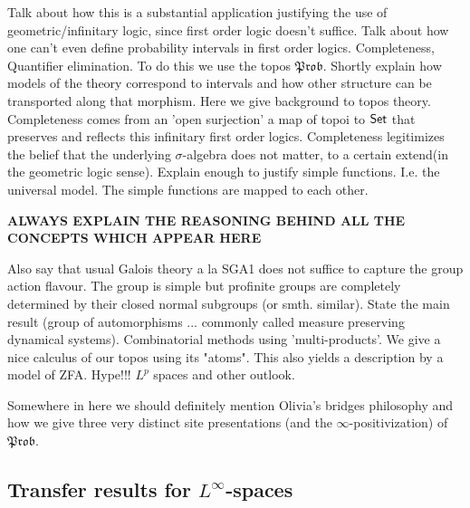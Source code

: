 \documentclass[a4paper]{amsproc}
\theoremstyle{plain}
\theoremstyle{definition}
\theoremstyle{remark}
\numberwithin{equation}{section}
\newcommand{\Set}{\textup{\textsf{Set}}}
\newcommand{\Prob}{\mathfrak{Prob}}
\begin{document}
\indent Talk about how this is a substantial application justifying the use of geometric/infinitary logic, since first order logic doesn't suffice. Talk about how one can't even define probability intervals in first order logics. Completeness, Quantifier elimination.\newline
\indent To do this we use the topos $\Prob$. Shortly explain how models of the theory correspond to intervals and how other structure can be transported along that morphism. Here we give background to topos theory. Completeness comes from an 'open surjection' a map of topoi to $\Set$ that preserves and reflects this infinitary first order logics. Completeness legitimizes the belief that the underlying $\sigma$-algebra does not matter, to a certain extend(in the geometric logic sense). Explain enough to justify simple functions. I.e. the universal model. The simple functions are mapped to each other.
\begin{center}\textbf{ALWAYS EXPLAIN THE REASONING BEHIND ALL THE CONCEPTS WHICH APPEAR HERE}\end{center}
Also say that usual Galois theory a la SGA1 does not suffice to capture the group action flavour. The group is simple but profinite groups are completely determined by their closed normal subgroups (or smth. similar). State the main result (group of automorphisms ... commonly called measure preserving dynamical systems).\newline
\indent Combinatorial methods using 'multi-products'. We give a nice calculus of our topos using its "atoms". This also yields a description by a model of ZFA. \newline
\indent Hype!!! $L^p$ spaces and other outlook.

Somewhere in here we should definitely mention Olivia's bridges philosophy and how we give three very distinct site presentations (and the $\infty$-positivization) of $\Prob$.

\subsection{Transfer results for $L^\infty$-spaces}
\end{document}
